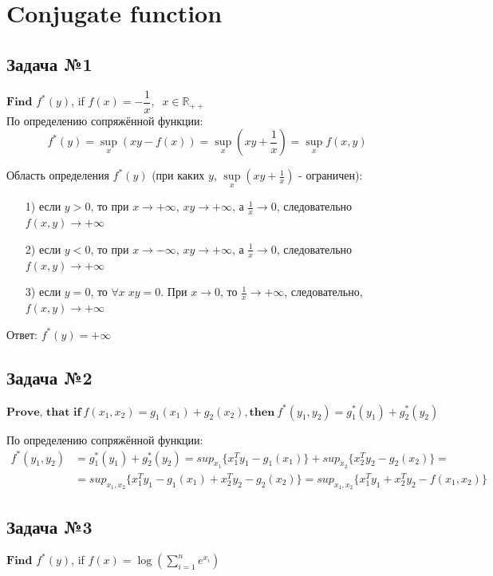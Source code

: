 \documentclass[12pt,letterpaper]{article}
\begin{document}
\newpage
\section{Conjugate function}
\subsection*{Задача №1}
$\textbf{Find}$ $f^*(y)$, if $f(x) = -\dfrac{1}{x}, \;\; x\in \mathbb{R}_{++}$\\

По определению сопряжённой функции: 
$$
f^*(y) = \sup_x \left( xy - f(x) \right) = \sup_x \left( xy + \frac{1}{x} \right) = \sup_x f(x,y)
$$

Область определения $ f^*(y) $ (при каких $ y $, $ \sup\limits_x \left( xy + \frac{1}{x} \right) $ - ограничен):
\begin{itemize}
	\item[1) ] если $ y > 0 $, то при $ x \rightarrow +\infty $, $ xy \rightarrow +\infty$, а $ \frac{1}{x} \rightarrow 0 $, следовательно $ f(x,y) \rightarrow +\infty $
	\item[2) ] если $ y < 0 $, то при $ x \rightarrow -\infty $, $ xy \rightarrow +\infty$, а $ \frac{1}{x} \rightarrow 0 $, следовательно $ f(x,y) \rightarrow +\infty $
	\item[3) ] если $ y = 0 $, то $ \forall x \; xy =0   $. При $ x \rightarrow 0 $, то $ \frac{1}{x} \rightarrow + \infty $, следовательно, $ f(x,y) \rightarrow +\infty $
\end{itemize}
Ответ: $ f^*(y) = +\infty $

\subsection*{Задача №2}
$\textbf{Prove, that if}\ f(x_1,x_2)=g_1(x_1)+g_2(x_2), \textbf{then}\ f^*(y_1,y_2)=g^*_1(y_1)+g^*_2(y_2)$

По определению сопряжённой функции: 
$$
\begin{aligned}
f^*(y_1,y_2)&=g^*_1(y_1)+g^*_2(y_2)= sup_{x_1}\{x^T_1y_1-g_1(x_1)\}+sup_{x_2}\{x^T_2y_2-g_2(x_2)\}=\\
&=sup_{x_1,x_2}\{x^T_1y_1-g_1(x_1)+x^T_2y_2-g_2(x_2)\}=sup_{x_1,x_2}\{x^T_1y_1+x^T_2y_2-f(x_1,x_2)\}
\end{aligned}
$$

\subsection*{Задача №3}
$\textbf{Find}$ $f^* (y)$, if $ f(x) = \log \left( \sum\limits_{i=1}^n e^{x_i} \right) $ \\
\end{document}
